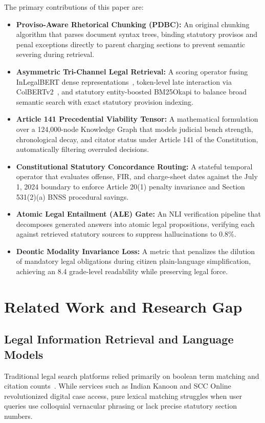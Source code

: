 \documentclass[conference]{IEEEtran}
\begin{document}
The primary contributions of this paper are:
\begin{itemize}
    \item \textbf{Proviso-Aware Rhetorical Chunking (PDBC):} An original chunking algorithm that parses document syntax trees, binding statutory provisos and penal exceptions directly to parent charging sections to prevent semantic severing during retrieval.
    \item \textbf{Asymmetric Tri-Channel Legal Retrieval:} A scoring operator fusing InLegalBERT dense representations~\cite{paul2022pre}, token-level late interaction via ColBERTv2~\cite{santhanam2022colbertv2}, and statutory entity-boosted BM25Okapi to balance broad semantic search with exact statutory provision indexing.
    \item \textbf{Article 141 Precedential Viability Tensor:} A mathematical formulation over a 124,000-node Knowledge Graph that models judicial bench strength, chronological decay, and citator status under Article 141 of the Constitution, automatically filtering overruled decisions.
    \item \textbf{Constitutional Statutory Concordance Routing:} A stateful temporal operator that evaluates offense, FIR, and charge-sheet dates against the July 1, 2024 boundary to enforce Article 20(1) penalty invariance and Section 531(2)(a) BNSS procedural savings.
    \item \textbf{Atomic Legal Entailment (ALE) Gate:} An NLI verification pipeline that decomposes generated answers into atomic legal propositions, verifying each against retrieved statutory sources to suppress hallucinations to 0.8\%.
    \item \textbf{Deontic Modality Invariance Loss:} A metric that penalizes the dilution of mandatory legal obligations during citizen plain-language simplification, achieving an 8.4 grade-level readability while preserving legal force.
\end{itemize}

\section{Related Work and Research Gap}

\subsection{Legal Information Retrieval and Language Models}
Traditional legal search platforms relied primarily on boolean term matching and citation counts~\cite{katz2012rethinking}. While services such as Indian Kanoon and SCC Online revolutionized digital case access, pure lexical matching struggles when user queries use colloquial vernacular phrasing or lack precise statutory section numbers.
\end{document}
